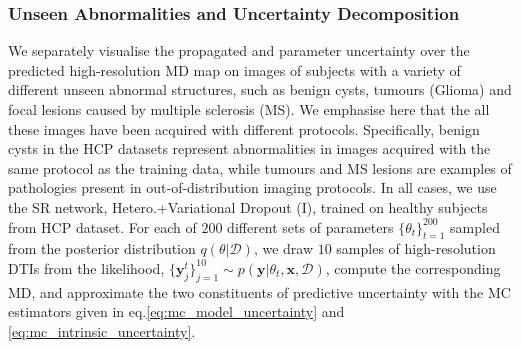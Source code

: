 

\subsubsection*{Unseen Abnormalities and Uncertainty Decomposition} \label{sec:unseen_abnormality}
We separately visualise the propagated  and parameter uncertainty over the predicted high-resolution MD map on images of subjects with a variety of different unseen abnormal structures, such as benign cysts, tumours (Glioma) and focal lesions caused by multiple sclerosis (MS). We emphasise here that the all these images have been acquired with different protocols. Specifically, benign cysts in the HCP datasets represent abnormalities in images acquired with the same protocol as the training data, while tumours and MS lesions are examples of pathologies present in out-of-distribution imaging protocols. In all cases, we use the SR network, Hetero.+Variational Dropout (I), trained on healthy subjects from HCP dataset. For each of $200$ different sets of parameters $\{\theta_{t}\}_{t=1}^{200}$ sampled from the posterior distribution $q(\theta|\mathcal{D})$,  we draw $10$ samples of high-resolution DTIs from the likelihood, $\{\mathbf{y}^{t}_{j}\}_{j=1}^{10} \sim p(\mathbf{y}|\theta_{t},\mathbf{x},\mathcal{D})$, compute the corresponding MD, and approximate the two constituents of predictive uncertainty with the MC estimators given in eq.\eqref{eq:mc_model_uncertainty} and \eqref{eq:mc_intrinsic_uncertainty}. 

